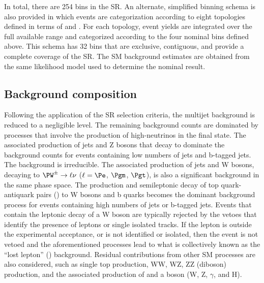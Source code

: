 In total, there are 254 bins in the SR. An alternate, simplified
binning schema is also provided in which events are categorization
according to eight topologies defined in terms of \njet and \nb. For
each topology, event yields are integrated over the full available
\scalht range and categorized according to the four nominal \mht bins
defined above. This schema has 32 bins that are exclusive, contiguous,
and provide a complete coverage of the SR. The SM background estimates
are obtained from the same likelihood model used to determine the
nominal result. 


\subsection{Background composition}
\label{sec:bkgd}

Following the application of the SR selection criteria, 
the multijet background is reduced to a negligible level. 
The remaining background counts are dominated by processes that
involve the production of high-\pt neutrinos in the final state. The
associated production of jets and Z bosons that decay to \znunu
dominate the background counts for events containing low numbers of
jets and b-tagged jets. The \znunuj background is irreducible.
The associated production of jets and W bosons, decaying to $\PW^\pm
\to \ell\nu$ ($\ell=\Pe$, $\Pgm$, $\Pgt$), is also a significant
background in the same phase space. The production and semileptonic
decay of top quark-antiquark pairs (\ttbar) to W bosons and b quarks
becomes the dominant background process for events containing high
numbers of jets or b-tagged jets. 
%
Events that contain the leptonic decay of a W boson are typically
rejected by the vetoes that identify the presence of leptons or single
isolated tracks. If the lepton is outside the experimental acceptance,
or is not identified or isolated, then the event is not vetoed and the
aforementioned processes lead to what is collectively known as the
``lost lepton'' (\lost) background.
%
Residual contributions from other SM processes are also considered,
such as single top production, WW, WZ, ZZ (diboson) production, and
the associated production of \ttbar and a boson ({\ttbar}W, {\ttbar}Z,
{\ttbar}$\gamma$, and {\ttbar}H).

